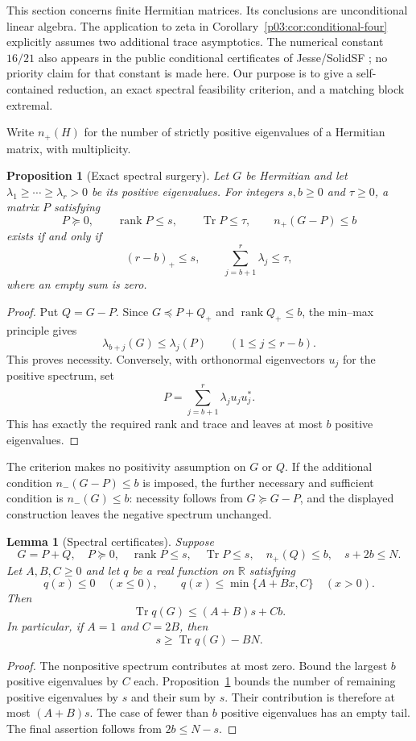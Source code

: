 \documentclass[11pt,letterpaper]{article}
\newtheorem{lemma}[theorem]{Lemma}
\newtheorem{proposition}[theorem]{Proposition}
\theoremstyle{definition}
\theoremstyle{remark}
\newcommand{\1}{\mathbf 1}
\begin{document}
This section concerns finite Hermitian matrices. Its conclusions are unconditional linear algebra. The application to zeta in Corollary~\ref{p03:cor:conditional-four} explicitly assumes two additional trace asymptotics. The numerical constant $16/21$ also appears in the public conditional certificates of Jesse/SolidSF \cite{Jesse}; no priority claim for that constant is made here. Our purpose is to give a self-contained reduction, an exact spectral feasibility criterion, and a matching block extremal.

Write $n_+(H)$ for the number of strictly positive eigenvalues of a Hermitian matrix, with multiplicity.

\begin{proposition}[Exact spectral surgery]\label{p03:prop:spectral-surgery}
Let $G$ be Hermitian and let $\lambda_1\ge\cdots\ge\lambda_r>0$ be its positive eigenvalues. For integers $s,b\ge0$ and $\tau\ge0$, a matrix $P$ satisfying
\[
 P\succeq0,\qquad \operatorname{rank}P\le s,\qquad
 \operatorname{Tr}P\le\tau,\qquad n_+(G-P)\le b
\]
exists if and only if
\[
 (r-b)_+\le s,\qquad \sum_{j=b+1}^{r}\lambda_j\le\tau,
\]
where an empty sum is zero.
\end{proposition}
\begin{proof}
Put $Q=G-P$. Since $G\preceq P+Q_+$ and $\operatorname{rank}Q_+\le b$, the min--max principle gives
\[
 \lambda_{b+j}(G)\le\lambda_j(P)\qquad(1\le j\le r-b).
\]
This proves necessity. Conversely, with orthonormal eigenvectors $u_j$ for the positive spectrum, set
\[
 P=\sum_{j=b+1}^{r}\lambda_j u_j u_j^*.
\]
This has exactly the required rank and trace and leaves at most $b$ positive eigenvalues.
\end{proof}

The criterion makes no positivity assumption on $G$ or $Q$. If the additional condition $n_-(G-P)\le b$ is imposed, the further necessary and sufficient condition is $n_-(G)\le b$: necessity follows from $G\succeq G-P$, and the displayed construction leaves the negative spectrum unchanged.

\begin{lemma}[Spectral certificates]\label{p03:lem:spectral-certificates}
Suppose
\begin{equation}\label{p03:eq:spectral-count-model}G=P+Q,\quad P\succeq0,\quad
 \operatorname{rank}P\le s,\quad \operatorname{Tr}P\le s,
 \quad n_+(Q)\le b,\quad s+2b\le N.
\end{equation}
Let $A,B,C\ge0$ and let $q$ be a real function on $\mathbb R$ satisfying
\[
 q(x)\le0\quad(x\le0),\qquad
 q(x)\le\min\{A+Bx,C\}\quad(x>0).
\]
Then
\[
 \operatorname{Tr}q(G)\le(A+B)s+Cb.
\]
In particular, if $A=1$ and $C=2B$, then
\[
 s\ge\operatorname{Tr}q(G)-BN.
\]
\end{lemma}
\begin{proof}
The nonpositive spectrum contributes at most zero. Bound the largest $b$ positive eigenvalues by $C$ each. Proposition~\ref{p03:prop:spectral-surgery} bounds the number of remaining positive eigenvalues by $s$ and their sum by $s$. Their contribution is therefore at most $(A+B)s$. The case of fewer than $b$ positive eigenvalues has an empty tail. The final assertion follows from $2b\le N-s$.
\end{proof}
\end{document}
